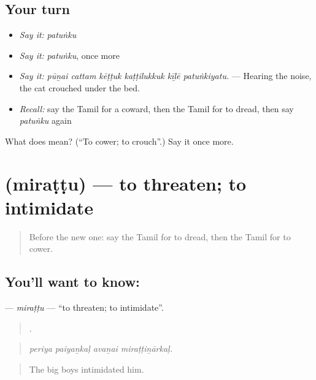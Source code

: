 \subsection*{Your turn}
\begin{itemize}
\raggedright
  \item \emph{Say it:} \emph{patuṅku}
  \item \emph{Say it:} \emph{patuṅku}, once more
  \item \emph{Say it:} \emph{pūṉai cattam kēṭṭuk kaṭṭilukkuk kīḻē patuṅkiyatu.} — Hearing the noise, the cat crouched under the bed.
  \item \emph{Recall:} say the Tamil for a coward, then the Tamil for to dread, then say \emph{patuṅku} again
\end{itemize}

\begin{tcolorbox}[breakable,colback=teal!4,colframe=teal!35!black,title={Before you move on}]
What does  mean? (\textquotedblleft{}To cower; to crouch\textquotedblright{}.) Say it once more.
\end{tcolorbox}
\section[\texorpdfstring{\ta{மிரட்டு} (miraṭṭu)}{மிரட்டு (miraṭṭu)}]{ (miraṭṭu) — to threaten; to intimidate}

\label{lesson:TA-C466-mirattu}



\begin{quote}
Before the new one: say the Tamil for to dread, then the Tamil for to cower.
\end{quote}

\subsection*{You'll want to know: }
\textbf{} — \emph{miraṭṭu} — \textquotedblleft{}to threaten; to intimidate\textquotedblright{}.

\begin{quote}
   .
\end{quote}

\begin{quote}
\emph{periya paiyaṉkaḷ avaṉai miraṭṭiṉārkaḷ.}
\end{quote}

\begin{quote}
The big boys intimidated him.
\end{quote}

